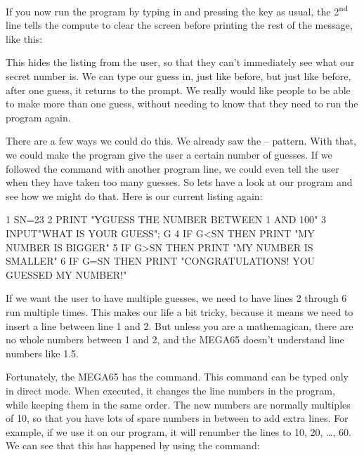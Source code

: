 
\needspace{2cm}
If you now run the program by typing in  and pressing the
 key as usual, the 2\textsuperscript{nd} line tells
the compute to clear the screen before printing the rest of the message, like this:


This hides the listing from the user, so that they can't immediately see
what our secret number is.  We can type our guess in, just like before,
but just like before, after one guess, it returns to the 
prompt.  We really would like people to be able to make more than one
guess, without needing to know that they need to run the program
again.

\needspace{3cm}
There are a few ways we could do this. We already saw the  --
 pattern. With that, we could make the program give the
user a certain number of guesses.  If we followed the 
command with another program line, we could even tell the user when
they have taken too many guesses.  So lets have a look at our
program and see how we might do that.  Here is our current listing again:

\begin{screenoutput}
1 SN=23
2 PRINT "ƳGUESS THE NUMBER BETWEEN 1 AND 100"
3 INPUT"WHAT IS YOUR GUESS"; G
4 IF G<SN THEN PRINT "MY NUMBER IS BIGGER"
5 IF G>SN THEN PRINT "MY NUMBER IS SMALLER"
6 IF G=SN THEN PRINT "CONGRATULATIONS! YOU GUESSED MY NUMBER!"
\end{screenoutput}

If we want the user to have multiple guesses, we need to have lines 2
through 6 run multiple times.  This makes our life a bit tricky,
because it means we need to insert a line between line 1 and 2. But
unless you are a mathemagican, there are no whole numbers between 1
and 2, and the MEGA65 doesn't understand line numbers like 1.5.

\needspace{4cm}
Fortunately, the MEGA65 has the
command.  This command can be typed only in direct mode. When
executed, it changes the line numbers in the program, while keeping
them in the same order.  The new numbers are normally multiples of 10,
so that you have lots of spare numbers in between to add extra lines.
For example, if we use it on our program, it will renumber the lines
to 10, 20, \ldots, 60. We can see that this has happened by using the
 command:


